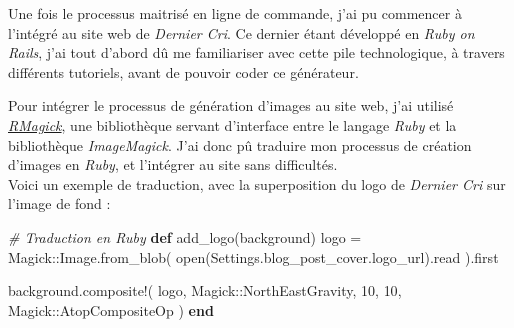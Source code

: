 \documentclass[12pt,a4paper]{article}
\newenvironment{Shaded}{}{}
\newcommand{\KeywordTok}[1]{\textcolor[rgb]{0.00,0.44,0.13}{\textbf{{#1}}}}
\newcommand{\DataTypeTok}[1]{\textcolor[rgb]{0.56,0.13,0.00}{{#1}}}
\newcommand{\DecValTok}[1]{\textcolor[rgb]{0.25,0.63,0.44}{{#1}}}
\newcommand{\CommentTok}[1]{\textcolor[rgb]{0.38,0.63,0.69}{\textit{{#1}}}}
\newcommand{\VariableTok}[1]{\textcolor[rgb]{0.10,0.09,0.49}{{#1}}}
\newcommand{\ExtensionTok}[1]{{#1}}
\newcommand{\NormalTok}[1]{{#1}}
\begin{document}
  \bigskip

  Une fois le processus maitrisé en ligne de commande, j'ai pu commencer à
  l'intégré au site web de \emph{Dernier Cri}. Ce dernier étant développé
  en \emph{Ruby on Rails}, j'ai tout d'abord dû me familiariser avec cette
  pile technologique, à travers différents tutoriels, avant de pouvoir
  coder ce générateur.

  \bigskip

  Pour intégrer le processus de génération d'images au site web, j'ai
  utilisé \href{https://github.com/rmagick/rmagick}{\emph{RMagick}}, une
  bibliothèque servant d'interface entre le langage \emph{Ruby} et la
  bibliothèque \emph{ImageMagick}. J'ai donc pû traduire mon processus de
  création d'images en \emph{Ruby}, et l'intégrer au site sans
  difficultés.\\
  Voici un exemple de traduction, avec la superposition du logo de
  \emph{Dernier Cri} sur l'image de fond :

  \begin{Shaded}
  \end{Shaded}

  \begin{Shaded}
  \begin{Highlighting}[]
  \CommentTok{# Traduction en Ruby}
  \KeywordTok{def} \NormalTok{add_logo(background)}
    \NormalTok{logo = }\DataTypeTok{Magick}\NormalTok{::}\DataTypeTok{Image}\NormalTok{.from_blob(}
      \NormalTok{open(}\DataTypeTok{Settings}\NormalTok{.blog_post_cover.logo_url).read}
    \NormalTok{).first}

    \NormalTok{background.composite!(}
      \NormalTok{logo,}
      \DataTypeTok{Magick}\NormalTok{::}\DataTypeTok{NorthEastGravity}\NormalTok{,}
      \DecValTok{10}\NormalTok{,}
      \DecValTok{10}\NormalTok{,}
      \DataTypeTok{Magick}\NormalTok{::}\DataTypeTok{AtopCompositeOp}
    \NormalTok{)}
  \KeywordTok{end}
  \end{Highlighting}
  \end{Shaded}
\end{document}
